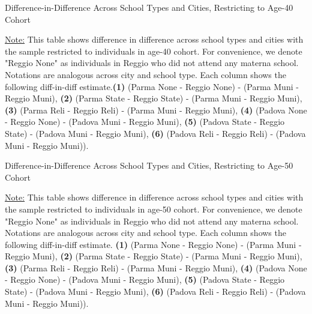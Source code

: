 \documentclass[11pt]{article}
\begin{document}
\begin{table}[H]
\begin{center}
	\caption{Difference-in-Difference Across School Types and Cities, Restricting to Age-40 Cohort}
	\scalebox{0.80}{
		}
\end{center}
\footnotesize
\underline{Note:} This table shows difference in difference across school types and cities with the sample restricted to individuals in age-40 cohort. For convenience, we denote "Reggio None" as individuals in Reggio who did not attend any materna school. Notations are analogous across city and school type. Each column shows the following diff-in-diff estimate.\textbf{(1)} (Parma None - Reggio None) - (Parma Muni - Reggio Muni), \textbf{(2)} (Parma State - Reggio State) - (Parma Muni - Reggio Muni), \textbf{(3)} (Parma Reli - Reggio Reli) - (Parma Muni - Reggio Muni), \textbf{(4)} (Padova None - Reggio None) - (Padova Muni - Reggio Muni),  \textbf{(5)} (Padova State - Reggio State) - (Padova Muni - Reggio Muni), \textbf{(6)} (Padova Reli - Reggio Reli) - (Padova Muni - Reggio Muni)). 
\end{table}

\begin{table}[H]
\begin{center}
	\caption{Difference-in-Difference Across School Types and Cities, Restricting to Age-50 Cohort}
	\scalebox{0.80}{
		}
\end{center}
\footnotesize
\underline{Note:} This table shows difference in difference across school types and cities with the sample restricted to individuals in age-50 cohort. For convenience, we denote "Reggio None" as individuals in Reggio who did not attend any materna school. Notations are analogous across city and school type. Each column shows the following diff-in-diff estimate. \textbf{(1)} (Parma None - Reggio None) - (Parma Muni - Reggio Muni), \textbf{(2)} (Parma State - Reggio State) - (Parma Muni - Reggio Muni), \textbf{(3)} (Parma Reli - Reggio Reli) - (Parma Muni - Reggio Muni), \textbf{(4)} (Padova None - Reggio None) - (Padova Muni - Reggio Muni),  \textbf{(5)} (Padova State - Reggio State) - (Padova Muni - Reggio Muni), \textbf{(6)} (Padova Reli - Reggio Reli) - (Padova Muni - Reggio Muni)). 
\end{table}
\end{document}
